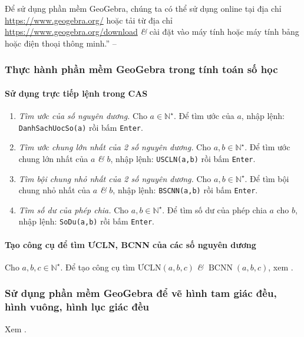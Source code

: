 \documentclass{article}
\numberwithin{equation}{section}
\begin{document}
Để sử dụng phần mềm GeoGebra, chúng ta có thể sử dụng online tại địa chỉ \url{https://www.geogebra.org/} hoặc tải từ địa chỉ \url{https://www.geogebra.org/download} \textit{\&} cài đặt vào máy tính hoặc máy tính bảng hoặc điện thoại thông minh.'' -- \cite[p. 119]{SGK_Toan_6_Canh_Dieu_tap_1}

\subsubsection{Thực hành phần mềm GeoGebra trong tính toán số học}

\paragraph{Sử dụng trực tiếp lệnh trong CAS}
\begin{enumerate}
	\item \textit{Tìm ước của số nguyên dương.} Cho $a\in\mathbb{N}^\star$. Để tìm ước của $a$, nhập lệnh: \texttt{DanhSachUocSo(a)} rồi bấm \texttt{Enter}.
	\item \textit{Tìm ước chung lớn nhất của 2 số nguyên dương.} Cho $a,b\in\mathbb{N}^\star$. Để tìm ước chung lớn nhất của $a$ \textit{\&} $b$, nhập lệnh: \texttt{USCLN(a,b)} rồi bấm \texttt{Enter}.
	\item \textit{Tìm bội chung nhỏ nhất của 2 số nguyên dương.} Cho $a,b\in\mathbb{N}^\star$. Để tìm bội chung nhỏ nhất của $a$ \textit{\&} $b$, nhập lệnh: \texttt{BSCNN(a,b)} rồi bấm \texttt{Enter}.
	\item \textit{Tìm số dư của phép chia.} Cho $a,b\in\mathbb{N}^\star$. Để tìm số dư của phép chia $a$ cho $b$, nhập lệnh: \texttt{SoDu(a,b)} rồi bấm \texttt{Enter}.
\end{enumerate}

\paragraph{Tạo công cụ để tìm ƯCLN, BCNN của các số nguyên dương}
Cho $a,b,c\in\mathbb{N}^\star$. Để tạo công cụ tìm $\mbox{ƯCLN}(a,b,c)$ \textit{\&} $\operatorname{BCNN}(a,b,c)$, xem \cite[pp. 120--121]{SGK_Toan_6_Canh_Dieu_tap_1}.

\subsubsection{Sử dụng phần mềm GeoGebra để vẽ hình tam giác đều, hình vuông, hình lục giác đều}
Xem \cite[pp. 122--124]{SGK_Toan_6_Canh_Dieu_tap_1}.
\end{document}
